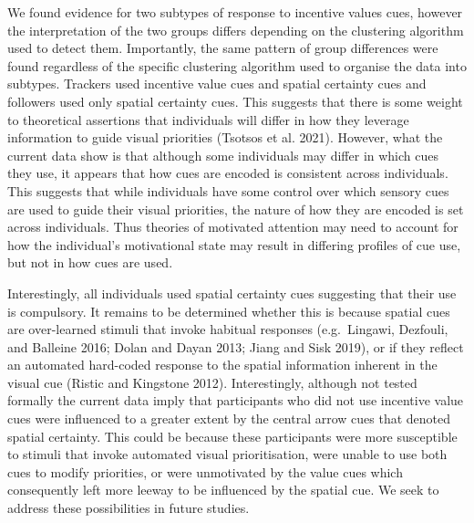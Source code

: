 \documentclass[11pt,halfline,a4paper,]{ouparticle}
\begin{document}
We found evidence for two subtypes of response to incentive values cues, however the interpretation of the two groups differs depending on the clustering algorithm used to detect them. Importantly, the same pattern of group differences were found regardless of the specific clustering algorithm used to organise the data into subtypes. Trackers used incentive value cues and spatial certainty cues and followers used only spatial certainty cues. This suggests that there is some weight to theoretical assertions that individuals will differ in how they leverage information to guide visual priorities (Tsotsos et al. 2021). However, what the current data show is that although some individuals may differ in which cues they use, it appears that how cues are encoded is consistent across individuals. This suggests that while individuals have some control over which sensory cues are used to guide their visual priorities, the nature of how they are encoded is set across individuals. Thus theories of motivated attention may need to account for how the individual's motivational state may result in differing profiles of cue use, but not in how cues are used.

Interestingly, all individuals used spatial certainty cues suggesting that their use is compulsory. It remains to be determined whether this is because spatial cues are over-learned stimuli that invoke habitual responses (e.g.~Lingawi, Dezfouli, and Balleine 2016; Dolan and Dayan 2013; Jiang and Sisk 2019), or if they reflect an automated hard-coded response to the spatial information inherent in the visual cue (Ristic and Kingstone 2012). Interestingly, although not tested formally the current data imply that participants who did not use incentive value cues were influenced to a greater extent by the central arrow cues that denoted spatial certainty. This could be because these participants were more susceptible to stimuli that invoke automated visual prioritisation, were unable to use both cues to modify priorities, or were unmotivated by the value cues which consequently left more leeway to be influenced by the spatial cue. We seek to address these possibilities in future studies.
\end{document}
